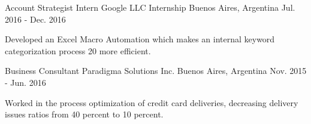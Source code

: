 \begin{cventries}
  \cventry
    {Account Strategist Intern} %
    {Google LLC Internship} %
    {Buenos Aires, Argentina} %
    {Jul. 2016 - Dec. 2016} %
    {
      \begin{cvitems} %
        \item {Developed an Excel Macro Automation which makes an internal keyword categorization process 20 more efficient.}
      \end{cvitems}
    }

  \cventry
    {Business Consultant} %
    {Paradigma Solutions Inc.} %
    {Buenos Aires, Argentina} %
    {Nov. 2015 - Jun. 2016} %
    {
      \begin{cvitems} %
        \item {Worked in the process optimization of credit card deliveries, decreasing delivery issues ratios from 40 percent to 10 percent.
        }
      \end{cvitems}
    }

\end{cventries}
